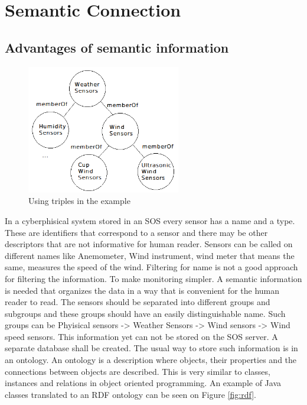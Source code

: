 \chapter{Semantic Connection}

\section{Advantages of semantic information}

\begin{figure}[h]
\centering
\includegraphics[width=0.6\textwidth]{figures/semws.png}
\caption{Using triples in the example\label{fig:semws}}
\end{figure}

In a cyberphisical system stored in an SOS every sensor has a name and a type. These are identifiers that correspond to a sensor and there may be other descriptors that are not informative for human reader. Sensors can be called on different names like Anemometer, Wind instrument, wind meter that means the same, measures the speed of the wind. Filtering for name is not a good approach for filtering the information. To make monitoring simpler. A semantic information is needed that organizes the data in a way that is convenient for the human reader to read. The sensors should be separated into different groups and subgroups and these groups should have an easily distinguishable name. Such groups can be Phyisical sensors -> Weather Sensors -> Wind sensors -> Wind speed sensors. This information yet can not be stored on the SOS server. A separate database shall be created. 
The usual way to store such information is in an ontology. 
An ontology is a description where objects, their properties and the connections between objects are described. This is very similar to classes, instances and relations in object oriented programming. An example of Java classes translated to an RDF ontology can be seen on Figure \ref{fig:rdf}\cite{g2d4}.


